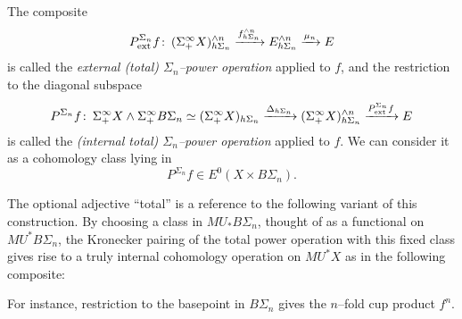 The composite \[P^{\Sigma_n}_{\mathrm{ext}}f\colon\thinspace (\Sigma^\infty_+ X)^{\wedge n}_{h\Sigma_n} \xrightarrow{f^{\wedge n}_{h\Sigma_n}} E^{\wedge n}_{h\Sigma_n} \xrightarrow{\mu_n} E\] is called the \textit{external (total) $\Sigma_n$--power operation} applied to $f$, and the restriction to the diagonal subspace \[P^{\Sigma_n}f \colon\thinspace \Sigma^\infty_+ X \wedge \Sigma^\infty_+ B\Sigma_n \simeq (\Sigma^\infty_+ X)_{h\Sigma_n} \xrightarrow{\Delta_{h\Sigma_n}} (\Sigma^\infty_+ X)^{\wedge n}_{h\Sigma_n} \xrightarrow{P^{\Sigma_n}_{\mathrm{ext}}f} E\] is called the \textit{(internal total) $\Sigma_n$--power operation} applied to $f$.  We can consider it as a cohomology class lying in \[P^{\Sigma_n} f \in E^0(X \times B\Sigma_n).\]

\begin{remark}\label{RestrictingSteenrodOpToBasepoint}
The optional adjective ``total'' is a reference to the following variant of this construction.  By choosing a class in $MU_* B\Sigma_n$, thought of as a functional on $MU^* B\Sigma_n$, the Kronecker pairing of the total power operation with this fixed class gives rise to a truly internal cohomology operation on $MU^* X$ as in the following composite:
\begin{center}
\end{center}
For instance, restriction to the basepoint in $B\Sigma_n$ gives the $n$--fold cup product $f^{n}$.
\end{remark}

